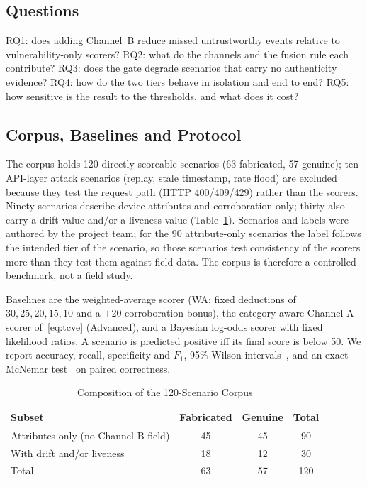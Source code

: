 \documentclass[journal]{IEEEtran}
\begin{document}
\subsection{Questions}
RQ1: does adding Channel~B reduce missed untrustworthy events relative to vulnerability-only scorers? RQ2: what do the channels and the fusion rule each contribute? RQ3: does the gate degrade scenarios that carry no authenticity evidence? RQ4: how do the two tiers behave in isolation and end to end? RQ5: how sensitive is the result to the thresholds, and what does it cost?

\subsection{Corpus, Baselines and Protocol}
The corpus holds 120 directly scoreable scenarios (63 fabricated, 57 genuine); ten API-layer attack scenarios (replay, stale timestamp, rate flood) are excluded because they test the request path (HTTP 400/409/429) rather than the scorers. Ninety scenarios describe device attributes and corroboration only; thirty also carry a drift value and/or a liveness value (Table~\ref{tab:corpus}). Scenarios and labels were authored by the project team; for the 90 attribute-only scenarios the label follows the intended tier of the scenario, so those scenarios test consistency of the scorers more than they test them against field data. The corpus is therefore a controlled benchmark, not a field study.

Baselines are the weighted-average scorer (WA; fixed deductions of $30,25,20,15,10$ and a $+20$ corroboration bonus), the category-aware Channel-A scorer of~\eqref{eq:tcve} (Advanced), and a Bayesian log-odds scorer with fixed likelihood ratios. A scenario is predicted positive iff its final score is below 50. We report accuracy, recall, specificity and $F_1$, 95\% Wilson intervals~\cite{wilson1927}, and an exact McNemar test~\cite{mcnemar1947} on paired correctness.

\begin{table}[!t]
\caption{Composition of the 120-Scenario Corpus}
\label{tab:corpus}
\centering
\footnotesize
\begin{tabular}{@{}lccc@{}}
\toprule
Subset & Fabricated & Genuine & Total\\
\midrule
Attributes only (no Channel-B field) & 45 & 45 & 90\\
With drift and/or liveness & 18 & 12 & 30\\
\midrule
Total & 63 & 57 & 120\\
\bottomrule
\end{tabular}
\end{table}
\end{document}
